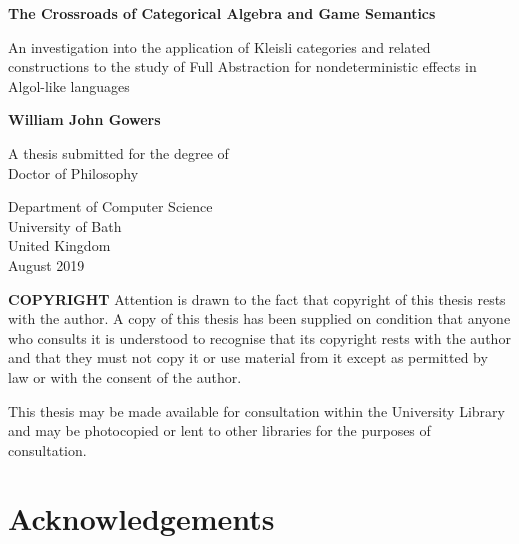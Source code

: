 \documentclass[11pt]{report}
\begin{document}
\begin{titlepage}
  \begin{center}
    \Huge
    \textbf{The Crossroads of Categorical Algebra and Game Semantics}
 
    \vspace{0.2cm}
    \LARGE
    An investigation into the application of Kleisli categories and related constructions to the study of Full Abstraction for nondeterministic effects in Algol-like languages
 
    \vspace{0.3cm}
 
    \textbf{William John Gowers}
 
    A thesis submitted for the degree of\\
    Doctor of Philosophy
 
    \vspace{0.1cm}
 
    \Large
    Department of Computer Science\\
    University of Bath\\
    United Kingdom\\
    August 2019

    \textbf{COPYRIGHT}
    Attention is drawn to the fact that copyright of this thesis rests with the author. A copy of this thesis has
    been supplied on condition that anyone who consults it is understood to recognise that its copyright rests
    with the author and that they must not copy it or use material from it except as permitted by law or with
    the consent of the author. 
    
    This thesis may be made available for consultation within
    the University Library and may be photocopied or lent to other libraries
    for the purposes of consultation. \ul{\hspace{64pt}}
 
  \end{center}
\end{titlepage}

\let\OldClearpage\clearpage
\let\clearpage\relax

\tableofcontents
\listoffigures

\let\clearpage\OldClearpage
\newpage

\section*{Acknowledgements}
\end{document}
